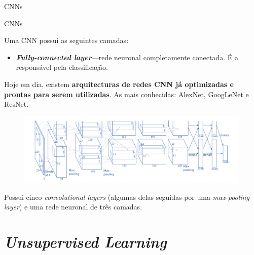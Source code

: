 \begin{frame}{CNNs \cont}

\end{frame}

\begin{frame}{CNNs \cont}

    Uma CNN possui as seguintes camadas:
    \begin{itemize}
    \item \textit{\textbf{Fully-connected layer}}---rede neuronal completamente conectada. É a responsável pela classificação.
\end{itemize}

\pauseskip

Hoje em dia, existem \textbf{arquitecturas de redes CNN já optimizadas e prontas para serem utilizadas}. As mais conhecidas: AlexNet, GoogLeNet e ResNet.

\pause


\begin{figure}
        \centering
    \includegraphics[width=.5\textwidth]{img/alexnet.png}
\end{figure}

Possui cinco \textit{convolutional layers} (algumas delas seguidas por uma \textit{max-pooling layer}) e uma rede neuronal de três camadas.

\end{frame}

\section{\textit{Unsupervised Learning}}

